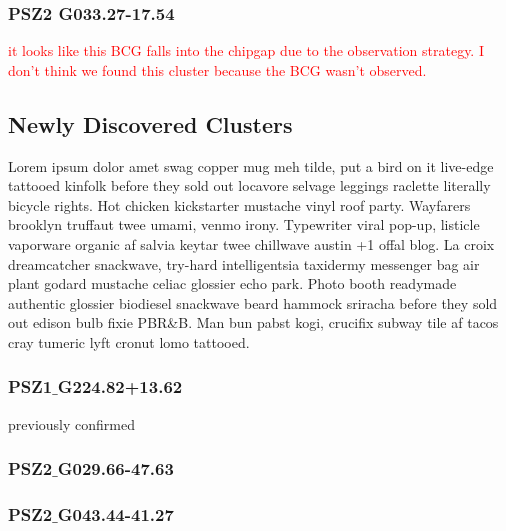 \documentclass[apj, revtex4]{emulateapj}
\newcommand{\editorial}[1]{\textcolor{red}{#1}}
\begin{document}
\subsubsection{PSZ2 G033.27-17.54}
\editorial{it looks like this BCG falls into the chipgap due to the observation strategy. I don't think we found this cluster because the BCG wasn't observed.}


\subsection{Newly Discovered Clusters}


Lorem ipsum dolor amet swag copper mug meh tilde, put a bird on it live-edge tattooed kinfolk before they sold out locavore selvage leggings raclette literally bicycle rights. Hot chicken kickstarter mustache vinyl roof party. Wayfarers brooklyn truffaut twee umami, venmo irony. Typewriter viral pop-up, listicle vaporware organic af salvia keytar twee chillwave austin +1 offal blog. La croix dreamcatcher snackwave, try-hard intelligentsia taxidermy messenger bag air plant godard mustache celiac glossier echo park. Photo booth readymade authentic glossier biodiesel snackwave beard hammock sriracha before they sold out edison bulb fixie PBR\&B. Man bun pabst kogi, crucifix subway tile af tacos cray tumeric lyft cronut lomo tattooed.

\subsubsection{PSZ1$\_$G224.82+13.62}
previously confirmed

\subsubsection{PSZ2$\_$G029.66-47.63}

\subsubsection{PSZ2$\_$G043.44-41.27}
\end{document}
